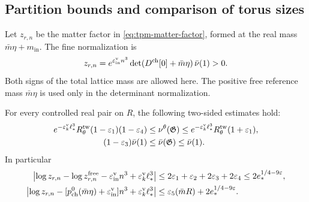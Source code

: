\subsection{Partition bounds and comparison of torus sizes}
\label{subsec:term-partition-bounds}

Let $z_{r,n}$ be the matter factor in
\eqref{eq:tpm-matter-factor}, formed at the real mass
$\bar m\eta+m_{\mathrm{in}}$. The fine normalization is
\begin{equation}\label{eq:term-matter-normalization}
 z_{r,n}
 =e^{\varepsilon_{\mathrm{in}}^{\rm v}n^3}
       \det(D^{\rm ch}[0]+\bar m\eta)\,\bar\nu(1)>0.
\end{equation}
Both signs of the total lattice mass are allowed here.
The positive free reference mass $\bar m\eta$ is used
only in the determinant normalization.

\begin{proposition}\label{prop:term-partition-bounds}
For every controlled real pair on $R$, the following
two-sided estimates hold:
\begin{align}
 e^{-\varepsilon_k^{\rm v}\ell_*^3}
 R_\theta^{\rm tw}(1-\varepsilon_1)(1-\varepsilon_4)
 &\le\nu^\theta(\mathfrak G)
 \le e^{-\varepsilon_k^{\rm v}\ell_*^3}
 R_\theta^{\rm tw}(1+\varepsilon_1),
                                   \label{eq:term-small-field-mass}\\
 (1-\varepsilon_3)\bar\nu(1)
 &\le\bar\nu(\mathfrak G)\le\bar\nu(1).
                                   \label{eq:term-full-mass}
\end{align}
In particular
\begin{align}
 \left|\log z_{r,n}-\log z_{r,n}^{\rm free}
       -\varepsilon_{\mathrm{in}}^{\rm v}n^3
                   +\varepsilon_k^{\rm v}\ell_*^3\right|
 &\le2\varepsilon_1+\varepsilon_2
                              +2\varepsilon_3+2\varepsilon_4
 \le2e_*^{1/4-9\varepsilon},\label{eq:term-partition-free-bound}\\
 \left|\log z_{r,n}
       -[p_{\rm ch}^0(\bar m\eta)
                     +\varepsilon_{\mathrm{in}}^{\rm v}]n^3
                    +\varepsilon_k^{\rm v}\ell_*^3\right|
 &\le\varepsilon_5(\bar mR)+2e_*^{1/4-9\varepsilon}.
                                   \label{eq:term-partition-pressure-bound}
\end{align}
\end{proposition}

